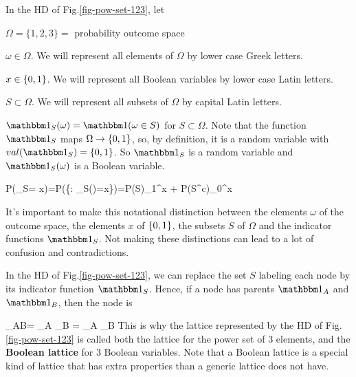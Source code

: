 In the HD of Fig.\ref{fig-pow-set-123}, let

$\Omega =\{1,2,3\}=$ probability outcome space

$\omega\in \Omega$. We will represent
all elements of $\Omega$
by lower case Greek letters.

$x\in \{0,1\}$. We will represent all Boolean variables by lower case
Latin letters.

$S\subset \Omega$. We will represent all subsets of $\Omega$ by capital Latin letters. 

$\indi_{S}(\omega)= \indi(\omega\in S)$
for $S\subset \Omega$. Note that the function $\indi_{S}$ maps  $\Omega\rightarrow \{0,1\}$,
so, by definition, it is a random variable
with $val(\indi_S)=\bool$.
So $\indi_S$ is a
random variable
and $\indi_S(\omega)$
is a Boolean variable.


\beq
P(\indi_S= x)=P(\{\omega\in \Omega : \indi_S(\omega)=x\})=P(S)\delta_1^x + P(S^c)\delta_0^x
\eeq

It's important to make this
notational distinction between the elements $\omega$ of the outcome
space, the elements $x$ of $\{0,1\}$,
the subsets $S$ of $\Omega$
and the indicator functions $\indi_S$. Not making these distinctions can lead to a lot
of confusion and contradictions.

In the HD of Fig.\ref{fig-pow-set-123}, we can replace
the set $S$ labeling each node by its indicator function $\indi_S$. Hence, if a node has parents $\indi_{A}$ and $\indi_B$, then the node is

\beq
\indi_{A\cap B}= \indi_A \indi_B =
\indi_A \A \indi_B
\eeq
This is why
the lattice
represented by the HD of Fig.\ref{fig-pow-set-123} is called both
the lattice for the power set of 3 elements,
and the {\bf Boolean lattice} for 3 Boolean variables. Note that a Boolean lattice is a special
kind of lattice
that has extra properties than a generic lattice
does not have.

